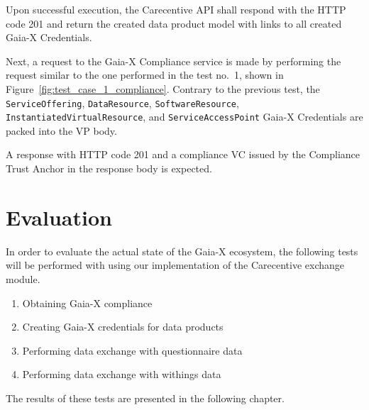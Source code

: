 Upon successful execution, the Carecentive API shall respond with the HTTP code 201 and return the created data product model with links to all created Gaia-X Credentials.

Next, a request to the Gaia-X Compliance service is made by performing the request similar to the one performed in the test no.~1, shown in Figure~\ref{fig:test_case_1_compliance}.
Contrary to the previous test, the \texttt{ServiceOffering}, \texttt{DataResource}, \texttt{SoftwareResource}, \texttt{InstantiatedVirtualResource}, and \texttt{ServiceAccessPoint} Gaia-X Credentials are packed into the VP body.

A response with HTTP code 201 and a compliance VC issued by the Compliance Trust Anchor in the response body is expected.

\section{Evaluation}\label{sec:evaluation}

In order to evaluate the actual state of the Gaia-X ecosystem, the following tests will be performed with using our implementation of the Carecentive exchange module.

\begin{enumerate}
    \item Obtaining Gaia-X compliance
    \item Creating Gaia-X credentials for data products
    \item Performing data exchange with questionnaire data
    \item Performing data exchange with withings data
\end{enumerate}

The results of these tests are presented in the following chapter.
